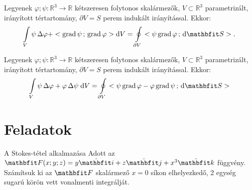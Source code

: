 \documentclass[lang=magyar]{math-handout}
\begin{document}
\vfill

\begin{theorem}
  Legyenek $\varphi; \psi: \mathbb R^3 \rightarrow \mathbb R$ kétszeresen
  folytonos skalármezők, $V \subset \mathbb R^3$ parametrizált, irányított
  tértartomány, $\partial V = S$ perem indukált irányítással. Ekkor:
  \[
    \int \limits_V
    \psi \, \Delta \varphi +
    \scalar{\grad \psi}{\grad \varphi}
    \diff V
    =
    \oint \limits_{\partial V} \scalar{\psi \grad \varphi}{\diff \rvec S}
    \text.
  \]
\end{theorem}

\vfill

\begin{theorem}
  Legyenek $\varphi; \psi: \mathbb R^3 \rightarrow \mathbb R$ kétszeresen
  folytonos skalármezők, $V \subset \mathbb R^3$ parametrizált, irányított
  tértartomány, $\partial V = S$ perem indukált irányítással. Ekkor:
  \[
    \int \limits_V
    \psi \, \Delta \varphi + \varphi \, \Delta \psi
    \; \diff V
    =
    \oint \limits_{\partial V}
    \scalar{\psi \grad \varphi - \varphi \grad \psi}{\diff \rvec S}
  \]
\end{theorem}

\clearpage
\section{Feladatok}

\begin{exercise}{A Stokes-tétel alkalmazása}
  Adott az $\rvec F(x;y;z) = y \uvec i + z \uvec j + x^3 \uvec k$ függvény.
  Számítsuk ki az $\rvec F$ skalármező $x = 0$ síkon elhelyezkedő, 2 egység
  sugarú körön vett vonalmenti integrálját.

\end{exercise}
\end{document}
